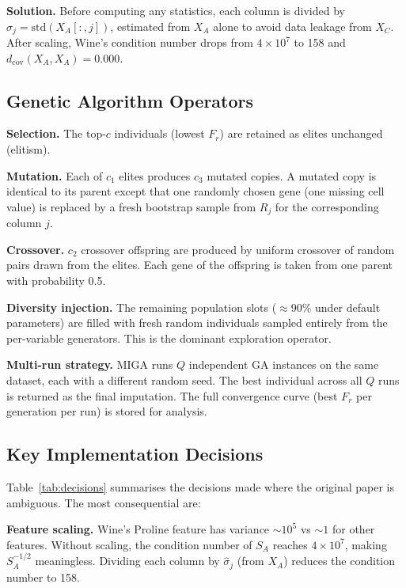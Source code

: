 \textbf{Solution.} Before computing any statistics, each column is divided by $\hat{\sigma}_j = \text{std}(X_A[:,j])$, estimated from $X_A$ alone to avoid data leakage from $X_C$. After scaling, Wine's condition number drops from $4 \times 10^7$ to 158 and $d_{\text{cov}}(X_A, X_A) = 0.000$.

\subsection{Genetic Algorithm Operators}

\textbf{Selection.} The top-$c$ individuals (lowest $F_r$) are retained as elites unchanged (elitism).

\textbf{Mutation.} Each of $c_1$ elites produces $c_3$ mutated copies. A mutated copy is identical to its parent except that one randomly chosen gene (one missing cell value) is replaced by a fresh bootstrap sample from $R_j$ for the corresponding column $j$.

\textbf{Crossover.} $c_2$ crossover offspring are produced by uniform crossover of random pairs drawn from the elites. Each gene of the offspring is taken from one parent with probability 0.5.

\textbf{Diversity injection.} The remaining population slots ($\approx$90\% under default parameters) are filled with fresh random individuals sampled entirely from the per-variable generators. This is the dominant exploration operator.

\textbf{Multi-run strategy.} MIGA runs $Q$ independent GA instances on the same dataset, each with a different random seed. The best individual across all $Q$ runs is returned as the final imputation. The full convergence curve (best $F_r$ per generation per run) is stored for analysis.

\subsection{Key Implementation Decisions}

Table~\ref{tab:decisions} summarises the decisions made where the original paper is ambiguous. The most consequential are:

\textbf{Feature scaling.} Wine's Proline feature has variance $\sim 10^5$ vs $\sim 1$ for other features. Without scaling, the condition number of $S_A$ reaches $4 \times 10^7$, making $S_A^{-1/2}$ meaningless. Dividing each column by $\hat{\sigma}_j$ (from $X_A$) reduces the condition number to 158.

